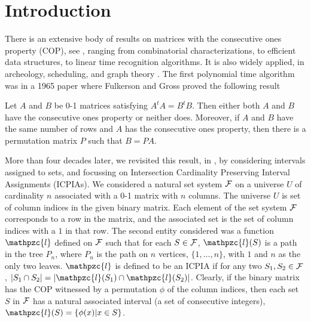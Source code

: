 \documentclass[envcountsect, envcountsame, 11pt]{../lib/llncs2e/llncs}
\def\cF{{\cal F}}
\def\cl{\mathpzc{l}}
\begin{document}
\section{Introduction}
There is an extensive body of results on matrices with the  consecutive ones property (COP), see \cite{wsr51,fg65,at72,bl76,wlh01,wlh02,mcc04,mm09,nsnrs09}, ranging from combinatorial characterizations, to efficient data structures, to linear time recognition algorithms.  It is also  widely applied, in archeology,  scheduling, and graph theory \cite{k77,abh98,ht02,mcg04,hl06}.  The first polynomial time algorithm was 
in a 1965 paper where Fulkerson and Gross \cite{fg65} proved the following result
\begin{theorem} \label{thm:fg65}
Let $A$ and $B$ be 0-1 matrices satisfying $A^t A = B^t B$.
Then either both $A$ and $B$ have the consecutive ones property or neither does. Moreover, if $A$ and $B$ have the same number of rows and $A$ has the consecutive ones property, then there is a permutation matrix $P$ such that $B = PA$.
\end{theorem}
More than four decades later, we revisited this result, in \cite{nsnrs09}, by considering intervals assigned to sets, and focussing on Intersection Cardinality Preserving Interval Assignments (ICPIAs).   We considered a natural set system $\cF$ on a universe $U$ of cardinality $n$ associated with a 0-1 matrix with $n$ columns.  The universe $U$ is set of column indices in the given binary matrix.    Each element of the set system $\cF$ corresponds to a row in the matrix, and the associated set is the set of column indices with a $1$ in that row.   The second entity considered was a function $\cl$ defined on $\cF$ such that for each $S \in \cF$, $\cl(S)$ is a path in the tree $P_n$, where $P_n$ is the path on $n$ vertices, $\{1, \ldots, n\}$, with $1$ and $n$ as the only two leaves.    $\cl$ is defined to be an ICPIA if for any two $S_1, S_2 \in \cF$, $|S_1 \cap S_2| = |\cl(S_1) \cap \cl(S_2)|$.     Clearly, if the binary matrix has the COP witnessed by a permutation $\phi$ of the column indices,  then each set $S$ in $\cF$ has a natural associated interval (a set of consecutive integers), $\cl(S) = \{\phi(x) | x \in S\}$.   
\end{document}
